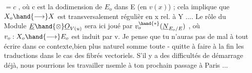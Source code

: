 $= c$ , où c est la dodimension de $E_{o}$ dans E (en $v(x)$) ; cela implique que
$X_{o}\hand{\longrightarrow} X$ est  transversalement régulièr en x rel. à Y .... Le rôle du Module
$\underline{E}\hand{\otimes}\underline{O}_{V(u)}$ sera ici joué par $v_{o}^{\hand{*}}(\underline{N}_{E_{o}/E})$ , où $v_{o}:X_{o}\hand{\longrightarrow} E_{o}$ est induit par v. Je
pense que tu n'auras pas de mal à tout écrire dans ce contexte,bien plus
naturel somme toute - quitte à faire à la fin les traductions dans le cas
des fibrés vectoriels. S'il y a des difficultés de démarrage déjà, nous
pourrions les travailler nsemle à ton prochain passage à Paris ... 
